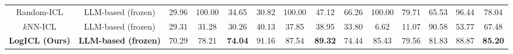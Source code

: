 \documentclass[lettersize,journal]{IEEEtran}
\begin{document}
\begin{table}[htbp]
{\begin{tabular}{c c ccc ccc ccc ccc}
Random-ICL & LLM-based (frozen)
& 29.96 & 100.00 & 34.65 
& 30.82 & 100.00 & 47.12 
& 66.26 & 100.00 & 79.71 
& 65.53 & 96.44 & 78.04 \\

$k$NN-ICL & LLM-based (frozen)
& 29.31 & 31.28 & 30.26 
& 40.13 & 37.85 & 38.95 
& 33.80 & 6.62 & 11.07 
& 90.58 & 53.77 & 67.48 \\

\midrule 

\textbf{LogICL (Ours)} & \textbf{LLM-based (frozen)}
& 70.29 & 78.21 & \textbf{74.04}
& 91.16 & 87.54 & \textbf{89.32}
& 74.44 & 85.43 & 79.56
& 81.83 & 88.87 & \textbf{85.20} \\

\bottomrule
\end{tabular}%
}
\end{table}






\end{document}
